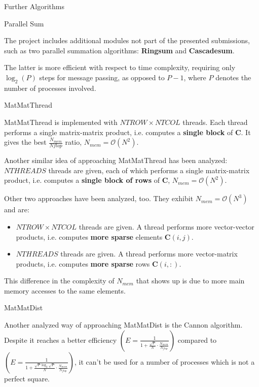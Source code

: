 \begin{chapter}{Further Algorithms}
    \begin{section}{Parallel Sum}
        \par The project includes additional modules not part of the presented submissions, such as two parallel summation algorithms: \textbf{Ringsum} and \textbf{Cascadesum}.
        \par The latter is more efficient with respect to time complexity, requiring only $\log_2(P)$ steps for message passing, as opposed to $P - 1$, where $P$ denotes the number of processes involved.
    \end{section}
    \begin{section}{MatMatThread}
        \par MatMatThread is implemented with $NTROW \times NTCOL$ threads. Each thread performs a single matrix-matrix product, i.e. computes a \textbf{single block} of $\mathbf{C}$. It gives the best $\frac{N_{mem}}{N{flop}}$ ratio, $N_{mem} = \mathcal{O}(N^2)$.
        \par Another similar idea of approaching MatMatThread has been analyzed: $NTHREADS$ threads are given, each of which performs a single matrix-matrix product, i.e. computes a \textbf{single block of rows} of $\mathbf{C}$, $N_{mem} = \mathcal{O}(N^2)$.\\
        \par Other two approaches have been analyzed, too. They exhibit $N_{mem} = \mathcal{O}(N^3)$ and are:
        \begin{itemize}
            \item $NTROW \times NTCOL$ threads are given. A thread performs more vector-vector products, i.e. computes \textbf{more sparse} elements $\mathbf{C}(i,j)$.
            \item $NTHREADS$ threads are given. A thread performs more vector-matrix products, i.e. computes \textbf{more sparse} rows $\mathbf{C}(i,:)$.
        \end{itemize}
        This difference in the complexity of $N_{mem}$ that shows up is due to more main memory accesses to the same elements.
    \end{section}
    \begin{section}{MatMatDist}
        \par Another analyzed way of approaching MatMatDist is the Cannon algorithm. Despite it reaches a better efficiency $\left( E = \frac{1}{1 + \frac{\sqrt{P}}{N} \cdot \frac{N_{mem}}{N_{flop}}}\right)$ compared to  $\left( E = \frac{1}{1 + \frac{\sqrt{P} \log_2{\sqrt{P}}}{N} \cdot \frac{N_{mem}}{N_{flop}}} \right)$, it can't be used for a number of processes which is not a perfect square.
    \end{section}
\end{chapter}